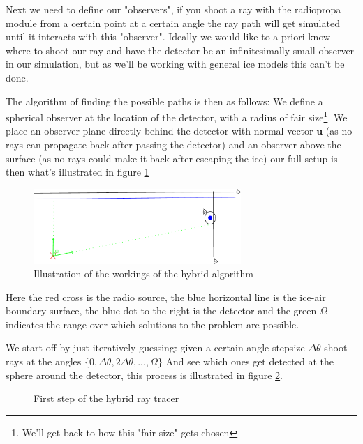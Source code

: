\documentclass[11pt,a4paper,faculty=we,language=en,doctype=report]{cls/ugent-doc}
\begin{document}
Next we need to define our "observers", if you shoot a ray with the radiopropa
module from a certain point at a certain angle the ray path will get simulated
until it interacts with this "observer".  Ideally we would like to a priori
know where to shoot our ray and have the detector be an infinitesimally small
observer in our simulation, but as we'll be working with general ice models
this can't be done.

The algorithm of finding the possible paths is then as follows: We define a
spherical observer at the location of the detector, with a radius of fair
size\footnote{We'll get back to how this "fair size" gets chosen}.  We place an observer plane directly
behind the detector with normal vector $\mathbf{u}$ (as no rays can propagate
back after passing the detector) and an observer above the surface (as no rays
could make it back after escaping the ice) our full setup is then what's
illustrated in figure \ref{fig:Illustration of hybrid algorithm}

\begin{figure}
  \centering
  \includegraphics[width=0.7\textwidth]{algoillu.pdf}
  \caption{Illustration of the workings of the hybrid algorithm}
  \label{fig:Illustration of hybrid algorithm}
\end{figure}

Here the red cross is the radio source, the blue horizontal line is the ice-air
boundary surface, the blue dot to the right is the detector and the green
$\Omega$ indicates the range over which solutions to the problem are possible.

We start off by just iteratively guessing: given a certain angle stepsize
$\Delta \theta$ shoot rays at the angles $\{0,\Delta \theta, 2\Delta
\theta,...,\Omega\}$ And see which ones get detected at the sphere around the
detector, this process is illustrated in figure \ref{figure:First step hybrid}.
\begin{figure}
	\centering
	\caption{First step of the hybrid ray tracer}
	\label{figure:First step hybrid}
\end{figure}
\end{document}
